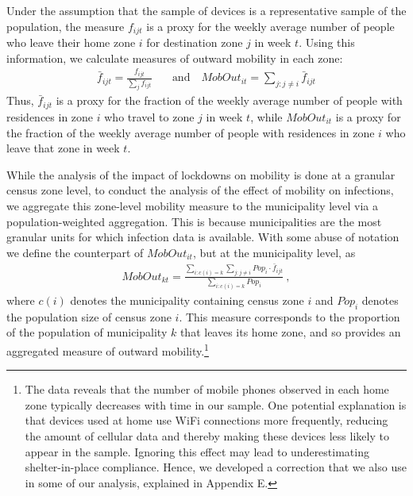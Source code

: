 Under the assumption that the sample of devices is a representative sample of the population, the measure $f_{ijt}$ is a proxy for the weekly average number of people who leave their home zone $i$ for destination zone $j$ in week $t$. Using this information, we calculate measures of outward mobility in each zone:
\begin{align}
  \bar f_{ijt}=\frac{f_{ijt}}{\sum_{j}f_{ijt}}
 \quad & \mbox{and} \quad
MobOut_{it} =\sum_{j:j\neq i} \bar f_{ijt} %
\end{align}
Thus, $\bar f_{ijt}$ is a proxy for the fraction of the weekly average number of people with residences in zone $i$ who travel to zone $j$ in week $t$, while $MobOut_{it}$ is a proxy for the fraction of the weekly average number of people with residences in zone $i$ who leave that zone in week $t$. 

While the analysis of the impact of lockdowns on mobility is done at a granular census zone level, to conduct the analysis of the effect of mobility on infections, we aggregate this zone-level mobility measure to the municipality level via a population-weighted aggregation. This is because municipalities are the most granular units for which infection data is available. With some abuse of notation we define the counterpart of $MobOut_{it}$, but at the municipality level, as
\begin{align}
 MobOut_{kt}%
=\frac{\sum_{i:c(i)=k}\sum_{j:j\neq i}Pop_i\cdot \bar f_{ijt}}{\sum_{i:c(i)=k}Pop_i}\ , \label{eq:MobOut}
\end{align}
where $c(i)$ denotes the municipality containing census zone $i$ and $Pop_i$ denotes the population size of census zone $i$. This measure corresponds to the proportion of the population of municipality $k$ that leaves its home zone, and so provides an aggregated measure of outward mobility.\footnote{The data reveals that the number of mobile phones observed in each home zone typically decreases with time in our sample. One potential explanation is that devices used at home use WiFi connections more frequently, reducing the amount of cellular data and thereby making these devices less likely to appear in the sample. Ignoring this effect may lead to underestimating shelter-in-place compliance. Hence, we developed a correction that we also use in some of our analysis, explained in Appendix E.}

